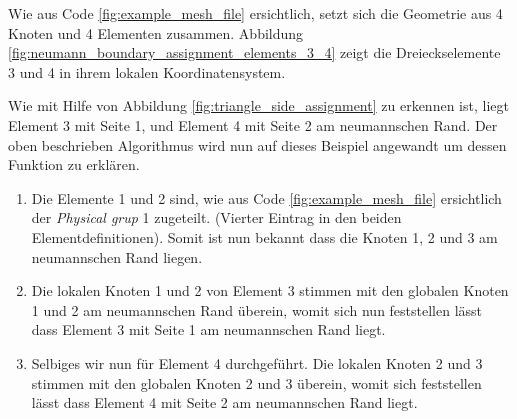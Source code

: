 Wie aus Code \ref{fig:example_mesh_file} ersichtlich, setzt sich die Geometrie aus 4 Knoten und 4 Elementen zusammen. Abbildung \ref{fig:neumann_boundary_assignment_elements_3_4} zeigt die Dreieckselemente 3 und 4 in ihrem lokalen Koordinatensystem. 

Wie mit Hilfe von Abbildung \ref{fig:triangle_side_assignment} zu erkennen ist, liegt Element 3 mit Seite 1, und Element 4 mit Seite 2 am neumannschen Rand. Der oben beschrieben Algorithmus wird nun auf dieses Beispiel angewandt um dessen Funktion zu erklären.\newline
\begin{enumerate}
	\item Die Elemente 1 und 2 sind, wie aus Code \ref{fig:example_mesh_file} ersichtlich der \textit{Physical grup} 1 zugeteilt. (Vierter Eintrag in den beiden Elementdefinitionen). Somit ist nun bekannt dass die Knoten 1, 2 und 3 am neumannschen Rand liegen.
	\item Die lokalen Knoten 1 und 2 von Element 3 stimmen mit den globalen Knoten 1 und 2 am neumannschen Rand überein, womit sich nun feststellen lässt dass Element 3 mit Seite 1 am neumannschen Rand liegt.
	\item Selbiges wir nun für Element 4 durchgeführt. Die lokalen Knoten 2 und 3 stimmen mit den globalen Knoten 2 und 3 überein, womit sich feststellen lässt dass Element 4 mit Seite 2 am neumannschen Rand liegt.
\end{enumerate}
